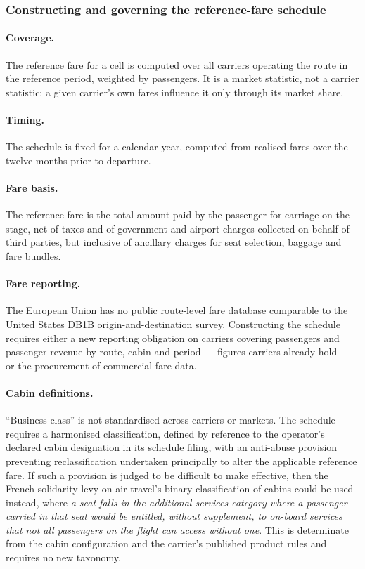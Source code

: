 \documentclass{article}
\begin{document}
\subsubsection{Constructing and governing the reference-fare schedule}
\paragraph{Coverage.} The reference fare for a cell is computed over all carriers operating the route in the reference period, weighted by passengers. It is a market statistic, not a carrier statistic; a given carrier's own fares influence it only through its market share.

\paragraph{Timing.} The schedule is fixed for a calendar year, computed from realised fares over the twelve months prior to departure. 

\paragraph{Fare basis.} The reference fare is the total amount paid by the passenger for carriage on the stage, net of taxes and of government and airport charges collected on behalf of third parties, but inclusive of ancillary charges for seat selection, baggage and fare bundles.

\paragraph{Fare reporting.} The European Union has no public route-level fare database comparable to the United States DB1B origin-and-destination survey. Constructing the schedule requires either a new reporting obligation on carriers covering passengers and passenger revenue by route, cabin and period --- figures carriers already hold --- or the procurement of commercial fare data. 

\paragraph{Cabin definitions.} ``Business class'' is not standardised across carriers or markets. The schedule requires a harmonised classification, defined by reference to the operator's declared cabin designation in its schedule filing, with an anti-abuse provision preventing reclassification undertaken principally to alter the applicable reference fare. If such a provision is judged to be difficult to make effective, then the French solidarity levy on air travel's binary classification of cabins could be used instead, where \textit{a seat falls in the additional-services category where a passenger carried in that seat would be entitled, without supplement, to on-board services that not all passengers on the flight can access without one}. This is determinate from the cabin configuration and the carrier's published product rules and requires no new taxonomy.
\end{document}
